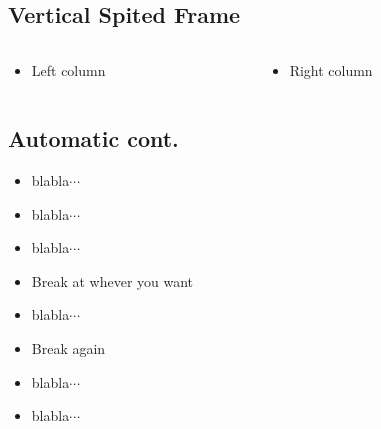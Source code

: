 \documentclass[compress]{beamer}
\begin{document}
    \subsection{Vertical Spited Frame}
        \begin{frame}{\subsecname}
            \begin{columns}[T] %
                \begin{column}[T]{.6\textwidth} %
                    \begin{itemize}
                        \item Left column
                    \end{itemize}
                \end{column}
                \begin{column}[T]{.4\textwidth} %
                    \begin{itemize}
                        \item Right column
                    \end{itemize}
                \end{column}
            \end{columns}
        \end{frame}
    \subsection{Automatic cont.}
    \begin{frame}[allowframebreaks]{\subsecname}
        \begin{itemize}
            \item blabla$\cdots$
            \item blabla$\cdots$
            \item blabla$\cdots$
            \item Break at whever you want
        \end{itemize}
        \framebreak
        \begin{itemize}
            \item blabla$\cdots$
            \item Break again
        \end{itemize}
        \framebreak
        \begin{itemize}
            \item blabla$\cdots$
            \item blabla$\cdots$
        \end{itemize}
    \end{frame}
\end{document}
